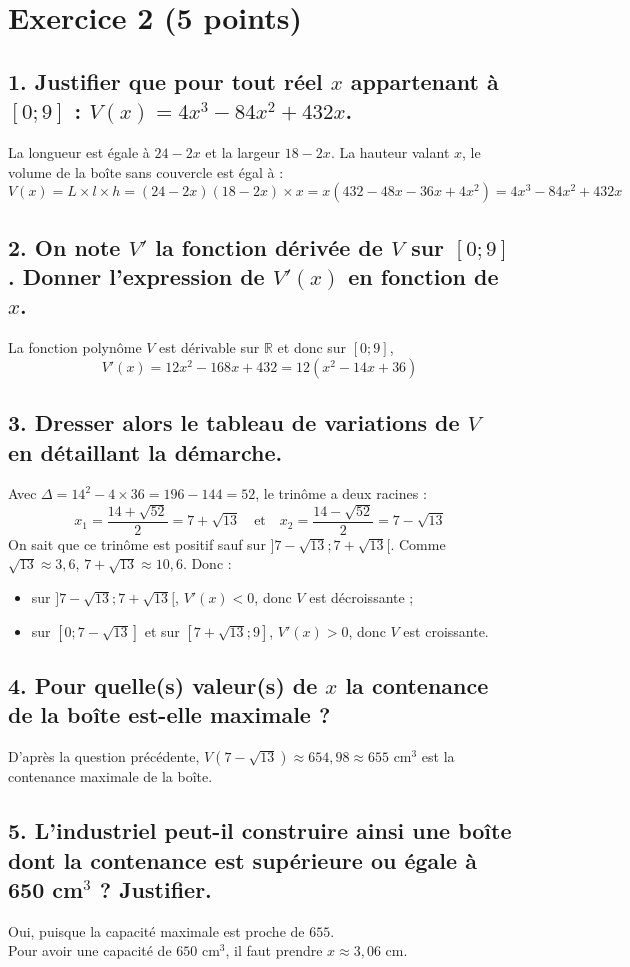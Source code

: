 \section*{Exercice 2 (5 points)}

\subsection*{1. Justifier que pour tout réel $x$ appartenant à $[0 ; 9]$ : $V(x) = 4x^3 - 84x^2 + 432x$.}
La longueur est égale à $24 - 2x$ et la largeur $18 - 2x$. La hauteur valant $x$, le volume de la boîte sans couvercle est égal à :
\[V(x) = L \times l \times h = (24 - 2x)(18 - 2x) \times x = x(432 - 48x - 36x + 4x^2) = 4x^3 - 84x^2 + 432x	\]
	
\subsection*{2. On note $V'$ la fonction dérivée de $V$ sur $[0 ; 9]$. Donner l’expression de $V'(x)$ en fonction de $x$.}
La fonction polynôme $V$ est dérivable sur $\mathbb{R}$ et donc sur $[0 ; 9]$,
	\[	V'(x) = 12x^2 - 168x + 432 = 12(x^2 - 14x + 36)	\]
	
\subsection*{3. Dresser alors le tableau de variations de $V$ en détaillant la démarche.}
Avec $\Delta = 14^2 - 4 \times 36 = 196 - 144 = 52$, le trinôme a deux racines :
	\[
	x_1 = \dfrac{14 + \sqrt{52}}{2} = 7 + \sqrt{13} \quad \text{et} \quad x_2 = \dfrac{14 - \sqrt{52}}{2} = 7 - \sqrt{13}
	\]
On sait que ce trinôme est positif sauf sur $]7 - \sqrt{13} ; 7 + \sqrt{13}[$. Comme $\sqrt{13} \approx 3,6$, $7 + \sqrt{13} \approx 10,6$. Donc :
	\begin{itemize}
		\item sur $]7 - \sqrt{13} ; 7 + \sqrt{13}[$, $V'(x) < 0$, donc $V$ est décroissante ;
		\item sur $[0 ; 7 - \sqrt{13}]$ et sur $[7 + \sqrt{13} ; 9]$, $V'(x) > 0$, donc $V$ est croissante.
	\end{itemize}
	
	\subsection*{4. Pour quelle(s) valeur(s) de $x$ la contenance de la boîte est-elle maximale ?}
	
	D’après la question précédente, $V(7 - \sqrt{13}) \approx 654,98 \approx 655 \text{ cm}^3$ est la contenance maximale de la boîte.
	
	\subsection*{5. L’industriel peut-il construire ainsi une boîte dont la contenance est supérieure ou égale à 650 cm$^3$ ? Justifier.}
	
	Oui, puisque la capacité maximale est proche de $655$.\\
	 Pour avoir une capacité de $650$ cm$^3$, il faut prendre $x \approx 3,06$ cm.
